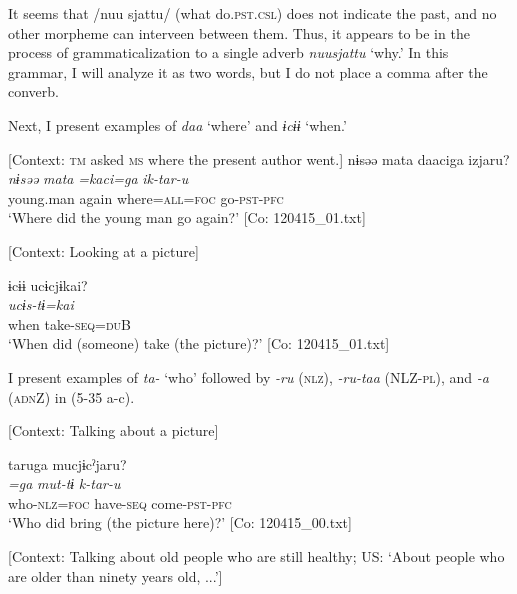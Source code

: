 It seems that /nuu sjattu/ (what do.\textsc{pst}.\textsc{csl}) does not indicate the past, and no other morpheme can interveen between them. Thus, it appears to be in the process of grammaticalization to a single adverb \textit{nuusjattu} ‘why.’ In this grammar, I will analyze it as two words, but I do not place a comma after the converb.

  Next, I present examples of \textit{daa} ‘where’ and \textit{ɨcɨɨ} ‘when.’

\ea \label{ex:5:34}  \ea \label{ex:5:a} [Context: \textsc{tm} asked \textsc{ms} where the present author went.]
\glll  nɨsəə  mata  daaciga  izjaru?\\
\textit{nɨsəə}  \textit{mata}  \textit{=kaci=ga}  \textit{ik-tar-u}\\
young.man  again  where=\textsc{all}=\textsc{foc}  go-\textsc{pst}-\textsc{pfc}\\
\glt ‘Where did the young man go again?’ [Co: 120415\_01.txt]

 \ex \label{ex:5:b} [Context: Looking at a picture]

\glll  ɨcɨɨ  ucɨcjɨkai?\\
\textit{}  \textit{ucɨs-tɨ=kai}\\
when  take-\textsc{seq}=\textsc{du}B\\
\glt ‘When did (someone) take (the picture)?’ [Co: 120415\_01.txt]
\z
\z

  I present examples of \textit{ta-} ‘who’ followed by \textit{{}-ru} (\textsc{nlz}), \textit{{}-ru-taa} (NLZ-\textsc{pl}), and \textit{{}-a} (\textsc{adn}Z) in (5-35 a-c).

\ea \label{ex:5:35}  \ea \label{ex:5:a} [Context: Talking about a picture]

\glll  taruga  mucjɨ\footnotemark  cˀjaru?\\
\textit{=ga}  \textit{mut-tɨ}  \textit{k-tar-u}\\
who-\textsc{nlz}=\textsc{foc}  have-\textsc{seq}  come-\textsc{pst}-\textsc{pfc}\\
\glt ‘Who did bring (the picture here)?’ [Co: 120415\_00.txt]

 \ex \label{ex:5:b} [Context: Talking about old people who are still healthy; US: ‘About people who are older than ninety years old, ...’]

